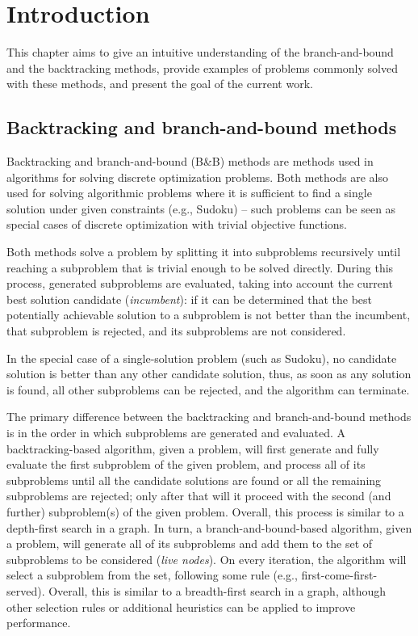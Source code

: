 \chapter{Introduction}
\label{chap:intro}


This chapter aims to give an intuitive understanding of the branch-and-bound and
the backtracking methods, provide examples of problems commonly solved with these methods,
and present the goal of the current work.

\section{Backtracking and branch-and-bound methods}

Backtracking and branch-and-bound (B\&B) methods are methods used in
algorithms for solving discrete optimization problems. Both methods are also used for solving
algorithmic problems where it is sufficient to find a single solution under given constraints
(e.g., Sudoku) -- such problems can be seen as special cases of discrete optimization with
trivial objective functions.

Both methods solve a problem by splitting it into subproblems recursively until reaching a
subproblem that is trivial enough to be solved directly. During this process, generated
subproblems are evaluated, taking into account the current best solution
candidate (\emph{incumbent}): if it can be determined that the best potentially
achievable solution to a subproblem is not better than the incumbent, that subproblem is
rejected, and its subproblems are not considered.

In the special case of a single-solution problem (such as Sudoku), no candidate solution
is better than any other candidate solution, thus, as soon as any solution is found,
all other subproblems can be rejected, and the algorithm can terminate.

The primary difference between the backtracking and branch-and-bound methods
is in the order in which subproblems are generated and evaluated. A backtracking-based
algorithm, given a problem, will first generate and fully evaluate the first subproblem
of the given problem, and process all of its subproblems until all the candidate solutions
are found or all the remaining subproblems are rejected; only after that will it proceed with
the second (and further) subproblem(s) of the given problem. Overall, this process is similar to
a depth-first search in a graph. In turn, a branch-and-bound-based algorithm, given a problem,
will generate all of its subproblems and add them to the set of subproblems to be considered
(\emph{live nodes}). On every iteration, the algorithm will select a subproblem from the set,
following some rule (e.g., first-come-first-served). Overall, this is similar to a breadth-first
search in a graph, although other selection rules or additional heuristics can be applied to
improve performance.

